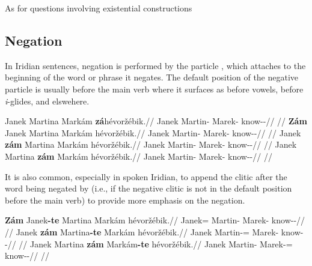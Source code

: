 As for questions involving existential constructions


\subsection{Negation}

In Iridian sentences, negation is performed by the particle , which attaches to the beginning of the word or phrase  it negates. The default position of the negative particle is usually before the main verb where it surfaces as  before vowels,  before \emph{i}-glides, and  elswehere.

\pex
\a
\begingl
    \gla Janek Martina Markám \textbf{zá}hévoržébik.//
    \glb Janek Martin-\Acc{} Marek-\Agt{} \Neg{}know-\Ben{}-\Pf{}//
    \glft {}//
\endgl
\a
\begingl
    \gla \textbf{Zám} Janek Martina Markám hévoržébik.//
    \glb \Neg{} Janek Martin-\Acc{} Marek-\Agt{} know-\Ben{}-\Pf{}//
    \glft {}//
\endgl
\a
\begingl
    \gla Janek \textbf{zám} Martina Markám hévoržébik.//
    \glb Janek \Neg{} Martin-\Acc{} Marek-\Agt{} know-\Ben{}-\Pf{}//
    \glft {}//
\endgl
\a
\begingl
    \gla Janek Martina \textbf{zám} Markám hévoržébik.//
    \glb Janek Martin-\Acc{} \Neg{} Marek-\Agt{} know-\Ben{}-\Pf{}//
    \glft {}//
\endgl
\xe

It is also common, especially in spoken Iridian, to append the clitic 
after the word being negated by  (i.e., if the negative clitic is not
in the default position before the main verb) to provide more emphasis on the
negation.

\pex
\a
\begingl
    \gla \textbf{Zám} Janek\textbf{-te} Martina Markám hévoržébik.//
    \glb \Neg{} Janek=\Foc{} Martin-\Acc{} Marek-\Agt{} know-\Ben{}-\Pf{}//
    \glft {}//
\endgl
\a
\begingl
    \gla Janek \textbf{zám} Martina\textbf{-te} Markám hévoržébik.//
    \glb Janek \Neg{} Martin-\Acc{}=\Foc{} Marek-\Agt{} know-\Ben{}-\Pf{}//
    \glft {}//
\endgl
\a
\begingl
    \gla Janek Martina \textbf{zám} Markám\textbf{-te} hévoržébik.//
    \glb Janek Martin-\Acc{} \Neg{} Marek-\Agt{}=\Foc{} know-\Ben{}-\Pf{}//
    \glft {}//
\endgl
\xe

